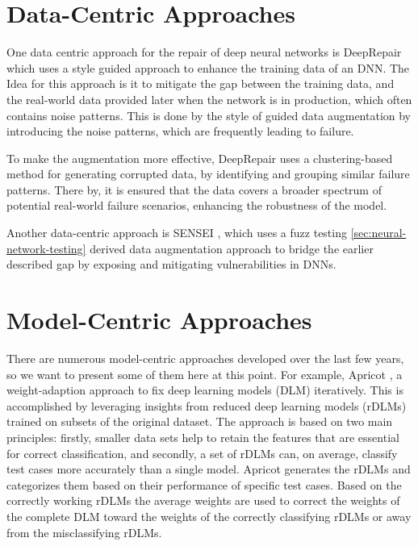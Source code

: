 \section{Data-Centric Approaches}\label{sec:data-centric-approaches}
One data centric approach for the repair of deep neural networks is DeepRepair \cite{yu_deeprepair_2022} which uses a style guided approach to enhance the training data of an DNN. The Idea for this approach is it to mitigate the gap between the training data, and the real-world data provided later when the network is in production, which often contains noise patterns.
This is done by the style of guided data augmentation by introducing the noise patterns, which are frequently leading to failure.

To make the augmentation more effective, DeepRepair uses a clustering-based method for generating corrupted data, by identifying and grouping similar failure patterns.
There by, it is ensured that the data covers a broader spectrum of potential real-world failure scenarios, enhancing the robustness of the model.

Another data-centric approach is SENSEI \cite{gao_fuzz_2020}, which uses a fuzz testing \ref{sec:neural-network-testing} derived data augmentation approach to bridge the earlier described gap by exposing and mitigating vulnerabilities in DNNs.

\section{Model-Centric Approaches}\label{sec:model-centric-approaches}
There are numerous model-centric approaches developed over the last few years, so we want to present some of them here at this point.
For example, Apricot \cite{zhang_apricot_2019}, a weight-adaption approach to fix deep learning models (DLM) iteratively.
This is accomplished by leveraging insights from reduced deep learning models (rDLMs) trained on subsets of the original dataset.
The approach is based on two main principles: firstly, smaller data sets help to retain the features that are essential for correct classification, and secondly, a set of rDLMs can, on average, classify test cases more accurately than a single model.
Apricot generates the rDLMs and categorizes them based on their performance of specific test cases.
Based on the correctly working rDLMs the average weights are used to correct the weights of the complete DLM toward the weights of the correctly classifying rDLMs or away from the misclassifying rDLMs.

